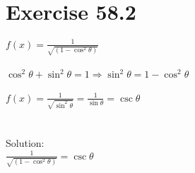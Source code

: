 \documentclass[a4paper, 10pt]{scrartcl}
\begin{document}
\section{Exercise 58.2}

$f(x) = \frac{1}{\sqrt{(1 - \cos^{2}{\theta})}}$\\
\\
$\cos^{2}{\theta} + \sin^{2}{\theta} = 1 \Rightarrow \sin^{2}{\theta} = 1 - \cos^{2}{\theta}$
\\
\\
$f(x) = \frac{1}{\sqrt{\sin^{2}{\theta}}} = \frac{1}{\sin{\theta}} = \csc{\theta}$\\
\\
\\
Solution:\\
$\frac{1}{\sqrt{(1 - \cos^{2}{\theta})}} = \csc{\theta}$\\
\end{document}
